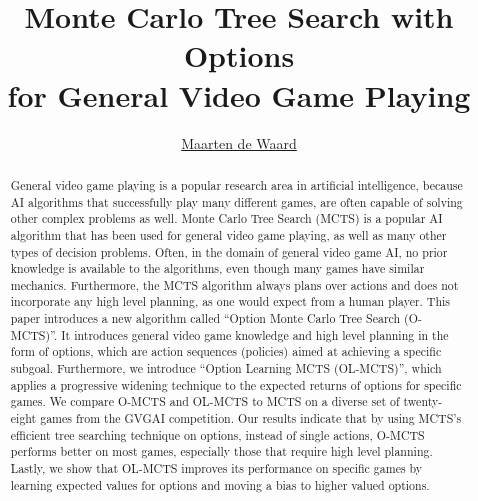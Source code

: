\documentclass[a4]{report}
\title{Monte Carlo Tree Search with Options\\for General Video Game Playing}
\author{\href{mailto:mrtndwrd@gmail.com}{Maarten de Waard}}
\begin{document}

\maketitle

\begin{abstract}
	General video game playing is a popular research area in artificial
	intelligence, because AI algorithms that successfully play many different
	games, are often capable of solving other complex problems as well.  Monte
	Carlo Tree Search (MCTS) is a popular AI algorithm that has been used for
	general video game playing, as well as many other types of decision
	problems. Often, in the domain of general video game AI, no prior knowledge
	is available to the algorithms, even though many games have similar
	mechanics. Furthermore, the MCTS algorithm always plans over actions and
	does not incorporate any high level planning, as one would expect from a
	human player. This paper introduces a new algorithm called ``Option Monte
	Carlo Tree Search (O-MCTS)''. It introduces general video game knowledge and
	high level planning in the form of options, which are action sequences
	(policies) aimed at achieving a specific subgoal. Furthermore, we introduce
	``Option Learning MCTS (OL-MCTS)'', which applies a progressive widening
	technique to the expected returns of options for specific games.  We compare
	O-MCTS and OL-MCTS to MCTS on a diverse set of twenty-eight games from the
	GVGAI competition. Our results indicate that by using MCTS's efficient tree
	searching technique on options, instead of single actions, O-MCTS performs
	better on most games, especially those that require high level planning.
	Lastly, we show that OL-MCTS improves its performance on specific games by
	learning expected values for options and moving a bias to higher valued
	options.
\end{abstract}

\tableofcontents




















\end{document}
